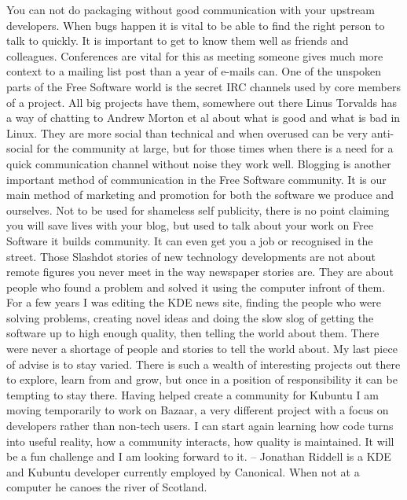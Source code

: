 You can not do packaging without good communication with your upstream developers. When bugs happen it is vital to be able to find the right person to talk to quickly. It is important to get to know them well as friends and colleagues. Conferences are vital for this as meeting someone gives much more context to a mailing list post than a year of e-mails can. 
One of the unspoken parts of the Free Software world is the secret IRC channels used by core members of a project. All big projects have them, somewhere out there Linus Torvalds has a way of chatting to Andrew Morton et al about what is good and what is bad in Linux. They are more social than technical and when overused can be very anti-social for the community at large, but for those times when there is a need for a quick communication channel without noise they work well.
Blogging is another important method of communication in the Free Software community. It is our main method of marketing and promotion for both the software we produce and ourselves. Not to be used for shameless self publicity, there is no point claiming you will save lives with your blog, but used to talk about your work on Free Software it builds community. It can even get you a job or recognised in the street.
Those Slashdot stories of new technology developments are not about remote figures you never meet in the way newspaper stories are. They are about people who found a problem and solved it using the computer infront of them. For a few years I was editing the KDE news site, finding the people who were solving problems, creating novel ideas and doing the slow slog of getting the software up to high enough quality, then telling the world about them. There were never a shortage of people and stories to tell the world about. 
My last piece of advise is to stay varied. There is such a wealth of interesting projects out there to explore, learn from and grow, but once in a position of responsibility it can be tempting to stay there. Having helped create a community for Kubuntu I am moving temporarily to work on Bazaar, a very different project with a focus on developers rather than non-tech users. I can start again learning how code turns into useful reality, how a community interacts, how quality is maintained. It will be a fun challenge and I am looking forward to it.
--
Jonathan Riddell is a KDE and Kubuntu developer currently employed by Canonical. When not at a computer he canoes the river of Scotland.
